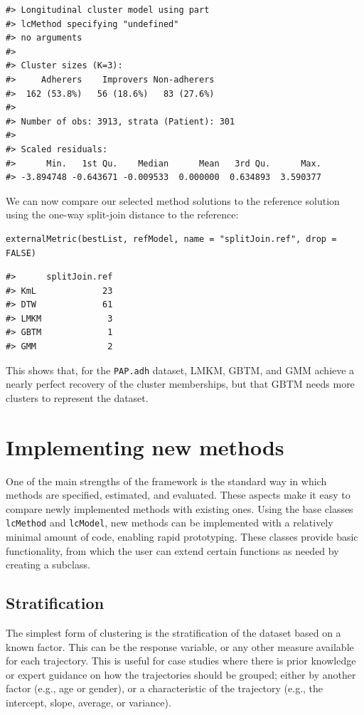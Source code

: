 \begin{verbatim}
#> Longitudinal cluster model using part
#> lcMethod specifying "undefined"
#> no arguments
#> 
#> Cluster sizes (K=3):
#>     Adherers    Improvers Non-adherers 
#>  162 (53.8%)   56 (18.6%)   83 (27.6%) 
#> 
#> Number of obs: 3913, strata (Patient): 301
#> 
#> Scaled residuals:
#>      Min.   1st Qu.    Median      Mean   3rd Qu.      Max. 
#> -3.894748 -0.643671 -0.009533  0.000000  0.634893  3.590377
\end{verbatim}

We can now compare our selected method solutions to the reference solution using the one-way split-join distance to the reference:

\begin{verbatim}
externalMetric(bestList, refModel, name = "splitJoin.ref", drop = FALSE)
\end{verbatim}

\begin{verbatim}
#>      splitJoin.ref
#> KmL             23
#> DTW             61
#> LMKM             3
#> GBTM             1
#> GMM              2
\end{verbatim}

This shows that, for the \texttt{PAP.adh} dataset, LMKM, GBTM, and GMM achieve a nearly perfect recovery of the cluster memberships, but that GBTM needs more clusters to represent the dataset.

\section{Implementing new methods}\label{sec:extension}

One of the main strengths of the framework is the standard way in which methods are specified, estimated, and evaluated. These aspects make it easy to compare newly implemented methods with existing ones. Using the base classes \texttt{lcMethod} and \texttt{lcModel}, new methods can be implemented with a relatively minimal amount of code, enabling rapid prototyping. These classes provide basic functionality, from which the user can extend certain functions as needed by creating a subclass.

\subsection{Stratification}\label{stratification}

The simplest form of clustering is the stratification of the dataset based on a known factor. This can be the response variable, or any other measure available for each trajectory. This is useful for case studies where there is prior knowledge or expert guidance on how the trajectories should be grouped; either by another factor (e.g., age or gender), or a characteristic of the trajectory (e.g., the intercept, slope, average, or variance).

